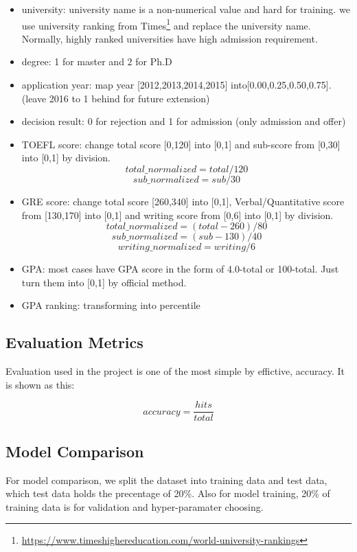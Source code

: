 \documentclass{article}
\begin{document}
\begin{itemize}
    \item university: university name is a non-numerical value and hard for training. we use university ranking from Times\footnote{\url{https://www.timeshighereducation.com/world-university-rankings}} and replace the university name. Normally, highly ranked universities have high admission requirement.
    \item degree: 1 for master and 2 for Ph.D
    \item application year: map year [2012,2013,2014,2015] into[0.00,0.25,0.50,0.75]. (leave 2016 to 1 behind for future extension)
    \item decision result: 0 for rejection and 1 for admission (only admission and offer)
    \item TOEFL score: change total score [0,120] into [0,1] and sub-score from [0,30] into [0,1] by division.
    $$
    total\_normalized=total/120
    $$
    $$
    sub\_normalized=sub/30
    $$
    \item GRE score: change total score [260,340] into [0,1], Verbal/Quantitative score from [130,170] into [0,1] and writing score from [0,6] into [0,1] by division.
    $$
    total\_normalized=(total-260)/80
    $$
    $$
    sub\_normalized=(sub-130)/40
    $$
    $$
    writing\_normalized=writing/6
    $$
    \item GPA: most cases have GPA score in the form of 4.0-total or 100-total. Just turn them into [0,1] by official method.
    \item GPA ranking: transforming into percentile
\end{itemize}

\subsection{Evaluation Metrics}

Evaluation used in the project is one of the most simple by effictive, accuracy. It is shown as this:

$$
accuracy=\frac{hits}{total}
$$

\subsection{Model Comparison}

For model comparison, we split the dataset into training data and test data, which test data holds the precentage of 20\%. Also for model training, 20\% of training data is for validation and hyper-paramater choosing.
\end{document}

